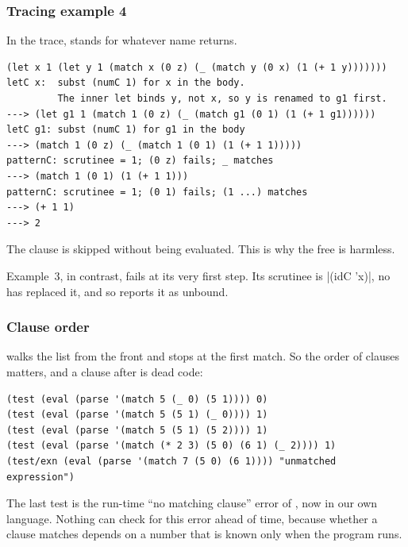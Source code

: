 \subsubsection{Tracing example 4} In the trace,  stands for whatever name  returns.
\begin{lstlisting}[style=repl]
(let x 1 (let y 1 (match x (0 z) (_ (match y (0 x) (1 (+ 1 y)))))))
letC x:  subst (numC 1) for x in the body.
         The inner let binds y, not x, so y is renamed to g1 first.
---> (let g1 1 (match 1 (0 z) (_ (match g1 (0 1) (1 (+ 1 g1))))))
letC g1: subst (numC 1) for g1 in the body
---> (match 1 (0 z) (_ (match 1 (0 1) (1 (+ 1 1)))))
patternC: scrutinee = 1; (0 z) fails; _ matches
---> (match 1 (0 1) (1 (+ 1 1)))
patternC: scrutinee = 1; (0 1) fails; (1 ...) matches
---> (+ 1 1)
---> 2
\end{lstlisting}
The clause  is skipped without being evaluated. This is why the free  is harmless.

Example~3, in contrast, fails at its very first step. Its scrutinee is \rkt|(idC 'x)|, no  has replaced it, and so  reports it as unbound.

\subsubsection{Clause order}  walks the list from the front and stops at the first match. So the order of clauses matters, and a clause after \code{\_} is dead code:
\begin{lstlisting}
(test (eval (parse '(match 5 (_ 0) (5 1)))) 0)
(test (eval (parse '(match 5 (5 1) (_ 0)))) 1)
(test (eval (parse '(match 5 (5 1) (5 2)))) 1)
(test (eval (parse '(match (* 2 3) (5 0) (6 1) (_ 2)))) 1)
(test/exn (eval (parse '(match 7 (5 0) (6 1)))) "unmatched expression")
\end{lstlisting}
The last test is the run-time ``no matching clause'' error of , now in our own language. Nothing can check for this error ahead of time, because whether a clause matches depends on a number that is known only when the program runs.

